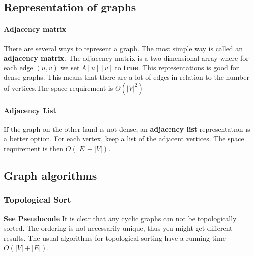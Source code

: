 \documentclass[paper=a4, fontsize=11pt]{scrartcl}
\numberwithin{equation}{section} %
\numberwithin{figure}{section} %
\numberwithin{table}{section} %
\theoremstyle{definition}
\begin{document}
\subsection{Representation of graphs}

\paragraph{Adjacency matrix} There are several ways to represent a graph. The
most simple way is called an \textbf{adjacency matrix}. The adjacency matrix is
a two-dimensional array where for each edge \( \left( u, v \right)\) we set
\(\mathrm{A}[u][v]\) to \textbf{true}.  This representations is good for dense
graphs. This means that there are a lot of edges in relation to the number of
vertices.The space requirement is \(\Theta\left( |V|^2 \right)\)

\paragraph{Adjacency List}
If the graph on the other hand is not dense, an \textbf{adjacency list} representation is a better option. For each vertex, keep a list of the adjacent vertices. The space requirement is then \( O \left( |E| + |V| \right)\).

\subsection{Graph algorithms}

\subsubsection{Topological Sort}
\hyperref[toposort]{\textbf{See Pseudocode}}
It is clear that any cyclic graphs can not be topologically sorted.
The ordering is not necessarily unique, thus you might get different results.
The usual algorithms for topological sorting have a running time
\( O \left( |V| + |E| \right) \).
\end{document}
